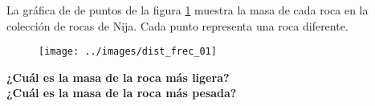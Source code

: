 \question[10] La gráfica de de puntos de la figura \ref{fig:dist_frec_01} muestra la masa de cada roca en la colección de rocas de Nija.
Cada punto representa una roca diferente.

\begin{figure}[H]
    \begin{center}
        \texttt{[image: ../images/dist\_frec\_01]}
    \end{center}
    \caption{}
    \label{fig:dist_frec_01}
\end{figure}
\textbf{¿Cuál es la masa de la roca más ligera?}\\
\textbf{¿Cuál es la masa de la roca más pesada?}